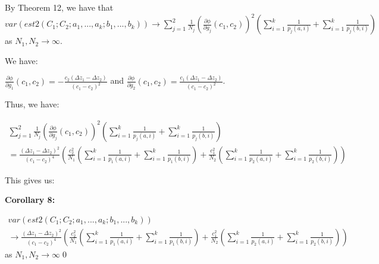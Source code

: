 \documentclass{article}
\begin{document}
By Theorem 12, we have that $\displaystyle var\left( est2\left( C_{1} ;C_{2} ;a_{1} ,...,a_{k} ;b_{1} ,...,b_{k}\right)\right)\rightarrow \sum _{j=1}^{2}\frac{1}{N_{j}}\left(\frac{\partial \phi }{\partial g_{j}}\left( c_{1} ,c_{2}\right)\right)^{2}\left(\sum _{i=1}^{k}\frac{1}{p_{j}\left( a,i\right)} +\sum _{i=1}^{k}\frac{1}{p_{j}\left( b,i\right)}\right)$ as $\displaystyle N_{1} ,N_{2}\rightarrow \infty $.

We have:

$\displaystyle \frac{\partial \phi }{\partial g_{1}}\left( c_{1} ,c_{2}\right) =-\frac{c_{2}\left( \Delta z_{1} -\Delta z_{2}\right)}{\left( c_{1} -c_{2}\right)^{2}}$ and $\displaystyle \frac{\partial \phi }{\partial g_{2}}\left( c_{1} ,c_{2}\right) =\frac{c_{1}\left( \Delta z_{1} -\Delta z_{2}\right)}{\left( c_{1} -c_{2}\right)^{2}}$.



Thus, we have:

$\displaystyle  \begin{array}{l}
\sum _{j=1}^{2}\frac{1}{N_{j}}\left(\frac{\partial \phi }{\partial g_{j}}\left( c_{1} ,c_{2}\right)\right)^{2}\left(\sum _{i=1}^{k}\frac{1}{p_{j}\left( a,i\right)} +\sum _{i=1}^{k}\frac{1}{p_{j}\left( b,i\right)}\right)\\
=\frac{\left( \Delta z_{1} -\Delta z_{2}\right)^{2}}{\left( c_{1} -c_{2}\right)^{4}}\left(\frac{c_{2}^{2}}{N_{1}}\left(\sum _{i=1}^{k}\frac{1}{p_{1}\left( a,i\right)} +\sum _{i=1}^{k}\frac{1}{p_{1}\left( b,i\right)}\right) +\frac{c_{1}^{2}}{N_{2}}\left(\sum _{i=1}^{k}\frac{1}{p_{2}\left( a,i\right)} +\sum _{i=1}^{k}\frac{1}{p_{2}\left( b,i\right)}\right)\right)
\end{array}$



This gives us:



\textbf{Corollary 8: }

$\displaystyle  \begin{array}{l}
var( est2( C_{1} ;C_{2} ;a_{1} ,...,a_{k} ;b_{1} ,...,b_{k}))\\
\rightarrow \frac{( \Delta z_{1} -\Delta z_{2})^{2}}{( c_{1} -c_{2})^{4}}\left(\frac{c_{2}^{2}}{N_{1}}\left(\sum _{i=1}^{k}\frac{1}{p_{1}( a,i)} +\sum _{i=1}^{k}\frac{1}{p_{1}( b,i)}\right) +\frac{c_{1}^{2}}{N_{2}}\left(\sum _{i=1}^{k}\frac{1}{p_{2}( a,i)} +\sum _{i=1}^{k}\frac{1}{p_{2}( b,i)}\right)\right)
\end{array}$ as $\displaystyle N_{1} ,N_{2}\rightarrow \infty $\qed 
\end{document}
